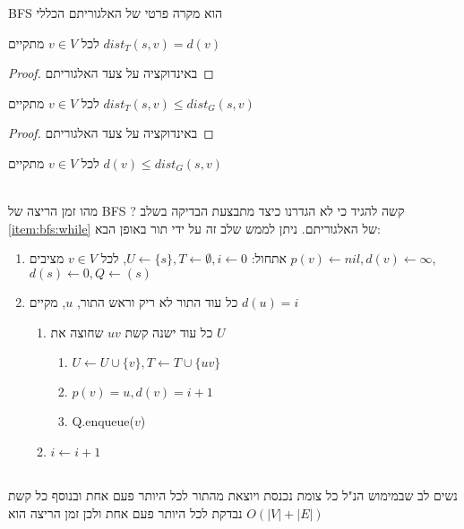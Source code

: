 \begin{corollary}
BFS
הוא מקרה פרטי של האלגוריתם הכללי
\end{corollary}

\begin{claim}
לכל
$v \in V$
מתקיים
$dist_T(s, v) = d(v)$
\end{claim}
\begin{proof}
באינדוקציה על צעד האלגוריתם
\end{proof}

\begin{claim}
לכל
$v \in V$
מתקיים
$dist_T(s, v) \leq dist_G(s,v)$
\end{claim}
\begin{proof}
באינדוקציה על צעד האלגוריתם
\end{proof}

\begin{theorem}
לכל
$v \in V$
מתקיים
$d(v) \leq dist_G(s,v)$
\end{theorem}
\\
\noindent
מהו זמן הריצה של BFS ? קשה להגיד כי לא הגדרנו כיצד מתבצעת הבדיקה בשלב 
\ref{item:bfs:while}
של האלגוריתם. ניתן לממש שלב זה על ידי תור באופן הבא:
\begin{enumerate}
\item
אתחול:
$U \leftarrow \{s\}, T \leftarrow \emptyset, i \leftarrow 0$, 
לכל 
$v \in V$
מציבים
$p(v) \leftarrow nil, d(v) \leftarrow \infty$,
$d(s) \leftarrow 0, Q \leftarrow (s)$
\item 
כל עוד התור לא ריק וראש התור, $u$, מקיים
$d(u) = i$
\begin{enumerate}
	\item
	כל עוד ישנה קשת 
	$uv$
	שחוצה את $U$
		\begin{enumerate}
		\item
		$U \leftarrow U \cup \{v\}, T \leftarrow T \cup \{uv\}$
		\item
		$p(v) = u, d(v) = i + 1$
		\item
		\textenglish{Q.enqueue($v$)}
		\end{enumerate}
	\item
	$i \leftarrow i+1$
	\end{enumerate}
\end{enumerate}
\\
\noindent
נשים לב שבמימוש הנ"ל כל צומת נכנסת ויוצאת מהתור לכל היותר פעם אחת 
ובנוסף כל קשת נבדקת לכל היותר פעם אחת ולכן זמן הריצה הוא 
$O(|V| + |E|)$

